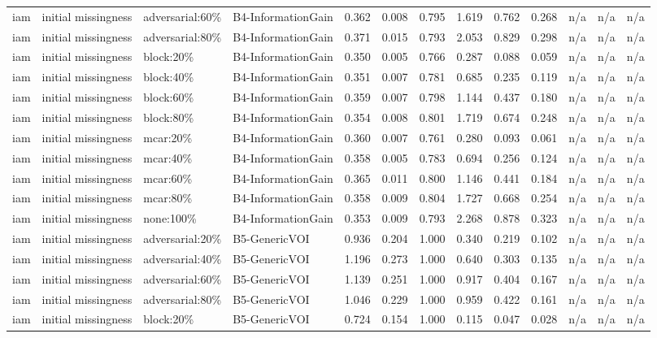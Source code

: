 \begin{table}[!ht]
{\begin{tabular}{lllllllllllll}
iam & initial missingness & adversarial:60\% & B4-InformationGain & 0.362 & 0.008 & 0.795 & 1.619 & 0.762 & 0.268 & n/a & n/a & n/a \\
iam & initial missingness & adversarial:80\% & B4-InformationGain & 0.371 & 0.015 & 0.793 & 2.053 & 0.829 & 0.298 & n/a & n/a & n/a \\
iam & initial missingness & block:20\% & B4-InformationGain & 0.350 & 0.005 & 0.766 & 0.287 & 0.088 & 0.059 & n/a & n/a & n/a \\
iam & initial missingness & block:40\% & B4-InformationGain & 0.351 & 0.007 & 0.781 & 0.685 & 0.235 & 0.119 & n/a & n/a & n/a \\
iam & initial missingness & block:60\% & B4-InformationGain & 0.359 & 0.007 & 0.798 & 1.144 & 0.437 & 0.180 & n/a & n/a & n/a \\
iam & initial missingness & block:80\% & B4-InformationGain & 0.354 & 0.008 & 0.801 & 1.719 & 0.674 & 0.248 & n/a & n/a & n/a \\
iam & initial missingness & mcar:20\% & B4-InformationGain & 0.360 & 0.007 & 0.761 & 0.280 & 0.093 & 0.061 & n/a & n/a & n/a \\
iam & initial missingness & mcar:40\% & B4-InformationGain & 0.358 & 0.005 & 0.783 & 0.694 & 0.256 & 0.124 & n/a & n/a & n/a \\
iam & initial missingness & mcar:60\% & B4-InformationGain & 0.365 & 0.011 & 0.800 & 1.146 & 0.441 & 0.184 & n/a & n/a & n/a \\
iam & initial missingness & mcar:80\% & B4-InformationGain & 0.358 & 0.009 & 0.804 & 1.727 & 0.668 & 0.254 & n/a & n/a & n/a \\
iam & initial missingness & none:100\% & B4-InformationGain & 0.353 & 0.009 & 0.793 & 2.268 & 0.878 & 0.323 & n/a & n/a & n/a \\
iam & initial missingness & adversarial:20\% & B5-GenericVOI & 0.936 & 0.204 & 1.000 & 0.340 & 0.219 & 0.102 & n/a & n/a & n/a \\
iam & initial missingness & adversarial:40\% & B5-GenericVOI & 1.196 & 0.273 & 1.000 & 0.640 & 0.303 & 0.135 & n/a & n/a & n/a \\
iam & initial missingness & adversarial:60\% & B5-GenericVOI & 1.139 & 0.251 & 1.000 & 0.917 & 0.404 & 0.167 & n/a & n/a & n/a \\
iam & initial missingness & adversarial:80\% & B5-GenericVOI & 1.046 & 0.229 & 1.000 & 0.959 & 0.422 & 0.161 & n/a & n/a & n/a \\
iam & initial missingness & block:20\% & B5-GenericVOI & 0.724 & 0.154 & 1.000 & 0.115 & 0.047 & 0.028 & n/a & n/a & n/a \\

\end{tabular}}
\end{table}
